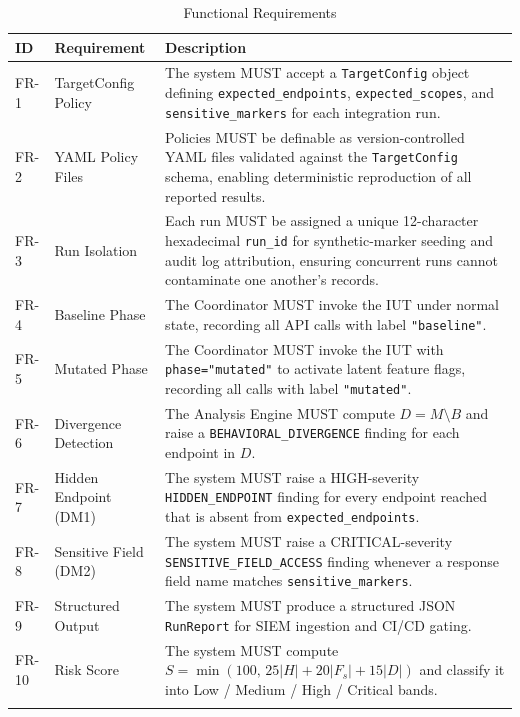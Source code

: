 \documentclass[12pt,a4paper]{report}
\begin{document}
\begin{longtable}{p{1.2cm}p{3.2cm}p{9.1cm}}
    \toprule
    \textbf{ID} & \textbf{Requirement} & \textbf{Description} \\
    \midrule
    \endhead
    FR-1 & TargetConfig Policy   &
        The system MUST accept a \texttt{TargetConfig} object defining
        \texttt{expected\_endpoints}, \texttt{expected\_scopes}, and
        \texttt{sensitive\_markers} for each integration run.                                  \\[6pt]
    FR-2 & YAML Policy Files     &
        Policies MUST be definable as version-controlled YAML files validated against the
        \texttt{TargetConfig} schema, enabling deterministic reproduction of all reported
        results.                                                                               \\[6pt]
    FR-3 & Run Isolation         &
        Each run MUST be assigned a unique 12-character hexadecimal \texttt{run\_id} for
        synthetic-marker seeding and audit log attribution, ensuring concurrent runs cannot contaminate
        one another's records.                                                                 \\[6pt]
    FR-4 & Baseline Phase        &
        The Coordinator MUST invoke the IUT under normal state, recording all API calls
        with label \texttt{"baseline"}.                                                        \\[6pt]
    FR-5 & Mutated Phase         &
        The Coordinator MUST invoke the IUT with \texttt{phase="mutated"} to activate
        latent feature flags, recording all calls with label \texttt{"mutated"}.               \\[6pt]
    FR-6 & Divergence Detection  &
        The Analysis Engine MUST compute $D = M \setminus B$ and raise a
        \texttt{BEHAVIORAL\_DIVERGENCE} finding for each endpoint in $D$.                      \\[6pt]
    FR-7 & Hidden Endpoint (DM1) &
        The system MUST raise a HIGH-severity \texttt{HIDDEN\_ENDPOINT} finding for every
        endpoint reached that is absent from \texttt{expected\_endpoints}.                     \\[6pt]
    FR-8 & Sensitive Field (DM2) &
        The system MUST raise a CRITICAL-severity \texttt{SENSITIVE\_FIELD\_ACCESS} finding
        whenever a response field name matches \texttt{sensitive\_markers}.                    \\[6pt]
    FR-9 & Structured Output    &
        The system MUST produce a structured JSON \texttt{RunReport} for SIEM ingestion
        and CI/CD gating.                                                                      \\[6pt]
    FR-10 & Risk Score           &
        The system MUST compute $S = \min(100,\,25|H|+20|F_s|+15|D|)$ and classify it
        into Low / Medium / High / Critical bands.                                             \\
    \bottomrule
    \caption{Functional Requirements}
    \label{tab:fr}
\end{longtable}
\end{document}
